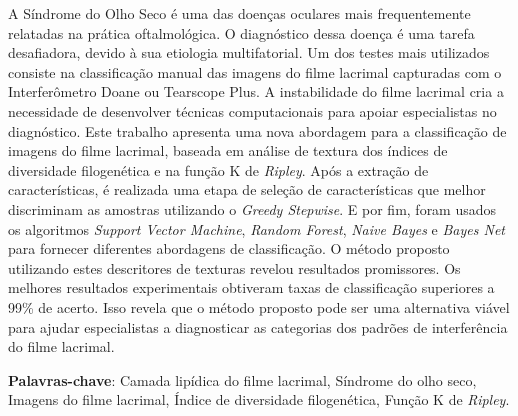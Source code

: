 \begin{resumo}

A Síndrome do Olho Seco é uma das doenças oculares mais frequentemente relatadas na prática oftalmológica. O diagnóstico dessa doença é uma tarefa desafiadora, devido à sua etiologia multifatorial. Um dos testes mais utilizados consiste na classificação manual das imagens do filme lacrimal capturadas com o Interferômetro Doane ou Tearscope Plus. A instabilidade do filme lacrimal cria a necessidade de desenvolver técnicas computacionais para apoiar especialistas no diagnóstico. Este trabalho apresenta uma nova abordagem para a classificação de imagens do filme lacrimal, baseada em análise de textura dos índices de diversidade filogenética e na função K de \textit{Ripley}. Após a extração de características, é realizada uma etapa de seleção de características que melhor discriminam as amostras utilizando o \textit{Greedy Stepwise}. E por fim, foram usados os algoritmos \textit{Support Vector Machine}, \textit{Random Forest}, \textit{Naive Bayes} e \textit{Bayes Net} para fornecer diferentes abordagens de classificação. O método proposto utilizando estes descritores de texturas revelou resultados promissores. Os melhores resultados experimentais obtiveram taxas de classificação superiores a 99\% de acerto. Isso revela que o método proposto pode ser uma alternativa viável para ajudar especialistas a diagnosticar as categorias dos padrões de interferência do filme lacrimal.

\textbf{Palavras-chave}: {Camada lipídica do filme lacrimal, Síndrome do olho seco, Imagens do filme lacrimal, Índice de diversidade filogenética, Função K de \textit{Ripley}}.
\end{resumo}